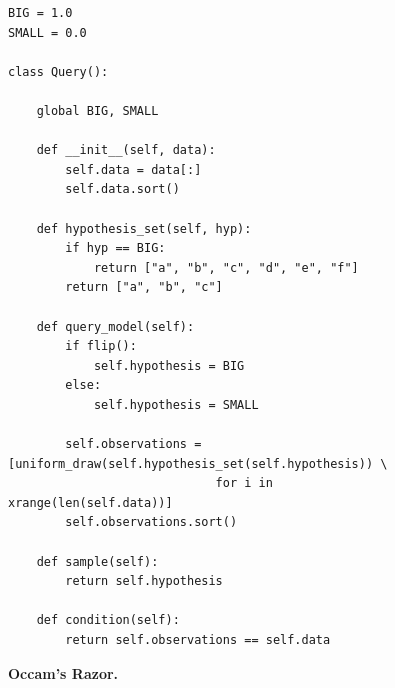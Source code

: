 \documentclass[12pt,letterpaper]{article}
\begin{document}
\begin{figure}[h!]
\begin{verbatim}
BIG = 1.0
SMALL = 0.0

class Query():

    global BIG, SMALL

    def __init__(self, data):
        self.data = data[:]
        self.data.sort()

    def hypothesis_set(self, hyp):
        if hyp == BIG:
            return ["a", "b", "c", "d", "e", "f"]
        return ["a", "b", "c"]

    def query_model(self):
        if flip():
            self.hypothesis = BIG
        else:
            self.hypothesis = SMALL

        self.observations = [uniform_draw(self.hypothesis_set(self.hypothesis)) \
                             for i in xrange(len(self.data))]
        self.observations.sort()

    def sample(self):
        return self.hypothesis

    def condition(self):
        return self.observations == self.data
\end{verbatim}
\caption{\small\textbf{Occam's Razor.}}
\label{fig:test5model}
\end{figure}
\end{document}
